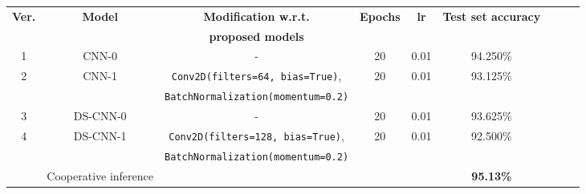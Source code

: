 \documentclass{article}
\begin{document}
\vspace{0.2cm}

\begin{center}
\begin{tabular}{ |c|c|c|c|c|c|c|c|c| } 
\hline
\vspace{-0.09cm}

\textbf{Ver.} &\textbf{Model} &\textbf{Modification w.r.t.} &\textbf{Epochs}&\textbf{lr} &\textbf{Test set accuracy}\\
\textbf{} &\textbf{} &\textbf{proposed models} &\textbf{}&\textbf{} &\textbf{}\\
\hline
1 & CNN-0 &-& 20 & 0.01 & 94.250\%\\
\hline
2 & CNN-1&\verb#Conv2D(filters=64, bias=True)#,&20&0.01&93.125\%\\
&&\verb#BatchNormalization(momentum=0.2)#&&&\\
\hline
3 & DS-CNN-0&-&20&0.01&93.625\%\\
\hline
4 & DS-CNN-1&\verb#Conv2D(filters=128, bias=True)#,&20&0.01&92.500\%\\
&& \verb#BatchNormalization(momentum=0.2)#&&&\\
\hline\hline
&Cooperative inference &&&&\textbf{95.13\%} \\
\hline
\end{tabular}

\end{center}
\end{document}
